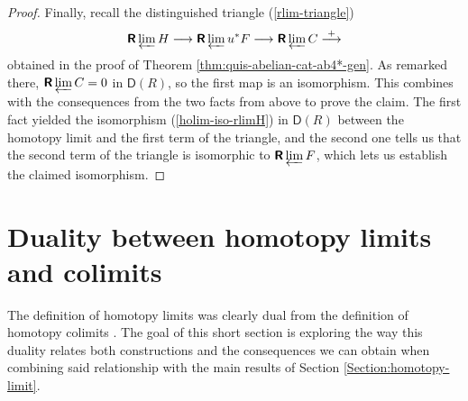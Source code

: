 \documentclass[reqno,11pt]{amsart}
\theoremstyle{plain}
\theoremstyle{remark}
\theoremstyle{definition}
\numberwithin{equation}{thm}
\newcommand{\D}{\boldsymbol{\mathsf{D}}}
\newcommand{\R}{\boldsymbol{\mathsf{R}}}
\newcommand{\lto}{\longrightarrow}
\begin{document}
\begin{proof}
		Finally, recall the distinguished triangle (\ref{rlim-triangle})
		\[
		\R\varprojlim H \lto \R\varprojlim u^*F \lto \R\varprojlim C \overset{+}{\lto}
		\]
		obtained in the proof of Theorem \ref{thm:quis-abelian-cat-ab4*-gen}. As remarked there, $\R\varprojlim C = 0$ in $\D(R)$, so the first map is an isomorphism. This combines with the consequences from the two facts from above to prove the claim. The first fact yielded the isomorphism (\ref{holim-iso-rlimH}) in $\D(R)$ between the homotopy limit and the first term of the triangle, and the second one tells us that the second term of the triangle is isomorphic to $\R\varprojlim F$, which lets us establish the claimed isomorphism.
	\end{proof}
	
	\section{Duality between homotopy limits and colimits}\label{Section:duality}
	The definition of homotopy limits was clearly dual from the definition of homotopy colimits \cite[\S 2]{AJS}. The goal of this short section is exploring the way this duality relates both constructions and the consequences we can obtain when combining said relationship with the main results of Section \ref{Section:homotopy-limit}.
	
\end{document}
